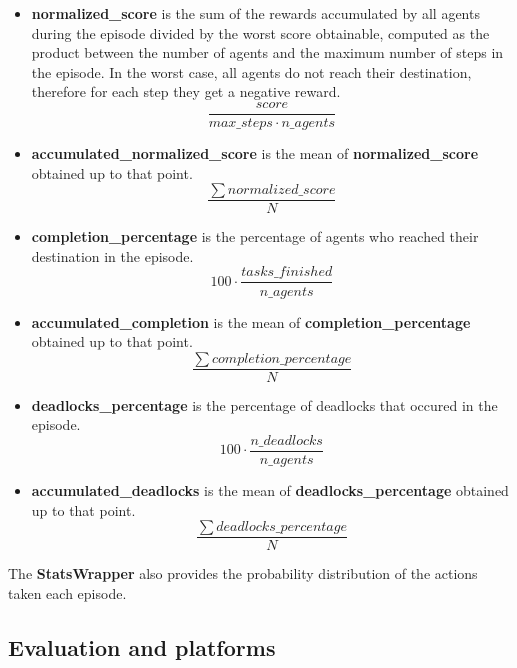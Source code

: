 \documentclass[11pt, a4paper, hidelinks]{report}
\begin{document}
\begin{itemize}
\item \textbf{normalized\_score} is the sum of the rewards accumulated by all agents during the episode divided by the worst score obtainable, computed as the product between the number of agents and the maximum number of steps in the episode.
In the worst case, all agents do not reach their destination, therefore for each step they get a negative reward.
\begin{equation}{\frac{score}{max\_steps \cdot n\_agents}}\label{eq:score}\end{equation}
\item \textbf{accumulated\_normalized\_score} is the mean of \textbf{normalized\_score} obtained up to that point.
\begin{equation}{\frac{\sum{normalized\_score}}{N}}\label{eq:score_acc}\end{equation}
\item \textbf{completion\_percentage} is the percentage of agents who reached their destination in the episode.
\begin{equation}{100 \cdot {\frac{tasks\_finished}{n\_agents}}}\label{eq:compl_perc}\end{equation}
\item \textbf{accumulated\_completion} is the mean of \textbf{completion\_percentage} obtained up to that point.
\begin{equation}{\frac{\sum{completion\_percentage}}{N}}\label{eq:compl_acc}\end{equation}
\item \textbf{deadlocks\_percentage} is the percentage of deadlocks that occured in the episode.
\begin{equation}{100 \cdot {\frac{n\_deadlocks}{n\_agents}}}\label{eq:deads_perc}\end{equation}
\item \textbf{accumulated\_deadlocks} is the mean of \textbf{deadlocks\_percentage} obtained up to that point.
\begin{equation}{\frac{\sum {deadlocks\_percentage}}{N}}\label{eq:deads_acc}\end{equation}
\end{itemize}

The \textbf{StatsWrapper} also provides the probability distribution of the actions taken each episode.


\subsection{Evaluation and platforms}\label{subsec:evaluation-and-platforms}
\end{document}
